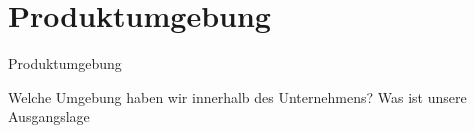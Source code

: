 \section{Produktumgebung}

Produktumgebung

Welche Umgebung haben wir innerhalb des Unternehmens? Was ist unsere Ausgangslage